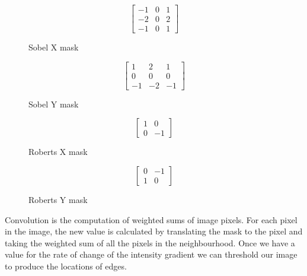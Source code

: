 \documentclass{article}
\begin{document}
	\begin{figure}[ht]
		\begin{minipage}[b]{.23\textwidth}
			\begingroup
			\renewcommand*{\arraystretch}{1.7}	
			\centering
			\[ \begin{bmatrix} -1 & 0 & 1 \\
								-2 & 0 & 2 \\
								-1 & 0 & 1
			\end{bmatrix} \]
			\endgroup
			\caption{Sobel X mask}
			\label{fig:sobel x mask}
		\end{minipage}
		\hfill
		\begin{minipage}[b]{.23\textwidth}
			\begingroup
			\renewcommand*{\arraystretch}{1.7}	
			\centering
			\[ \begin{bmatrix} 1 & 2 & 1 \\
								0 & 0 & 0 \\
								-1 & -2 & -1
			\end{bmatrix} \]
			\endgroup
			\caption{Sobel Y mask}
			\label{fig:sobel y mask}
		\end{minipage}
		\hfill
		\begin{minipage}[b]{.23\textwidth}
			\begingroup
			\renewcommand*{\arraystretch}{1.7}	
			\centering
			\[ \begin{bmatrix} 1 & 0 \\
								0 & -1
			\end{bmatrix} \]
			\endgroup
			\caption{Roberts X mask}
			\label{fig:roberts x mask}
		\end{minipage}
		\hfill
		\begin{minipage}[b]{.23\textwidth}
			\begingroup
			\renewcommand*{\arraystretch}{1.7}	
			\centering
			\[ \begin{bmatrix} 0 & -1 \\
								1 & 0
			\end{bmatrix} \]
			\endgroup
			\caption{Roberts Y mask}
			\label{fig:roberts y mask}
		\end{minipage}
		
	\end{figure}
	
	Convolution is the computation of weighted sums of image pixels. For each pixel in the image, the new value is calculated by translating the mask to the pixel and taking the weighted sum of all the pixels in the neighbourhood. Once we have a value for the rate of change of the intensity gradient we can threshold our image to produce the locations of edges.
	
\end{document}
